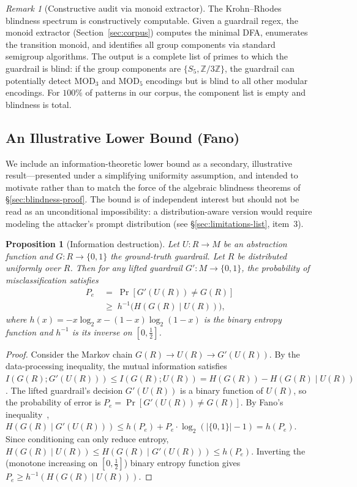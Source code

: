 \documentclass[letterpaper,twocolumn,10pt]{article}
\newtheorem{proposition}[theorem]{Proposition}
\theoremstyle{definition}
\theoremstyle{remark}
\newtheorem{remark}[theorem]{Remark}
\begin{document}
\begin{remark}[Constructive audit via monoid extractor]
The Krohn--Rhodes blindness spectrum is constructively computable.
Given a guardrail regex, the monoid extractor (Section~\ref{sec:corpus}) computes
the minimal DFA, enumerates the transition monoid, and identifies all group
components via standard semigroup algorithms.
The output is a complete list of primes to which the guardrail is blind: if the
group components are $\{S_5, \mathbb{Z}/3\mathbb{Z}\}$, the guardrail can
potentially detect $\mathrm{MOD}_3$ and $\mathrm{MOD}_5$ encodings but is blind to
all other modular encodings.
For $100\%$ of patterns in our corpus, the component list is empty and blindness
is total.
\end{remark}

\subsection{An Illustrative Lower Bound (Fano)}\label{sec:fano}

We include an information-theoretic lower bound as a secondary, illustrative
result---presented under a simplifying uniformity assumption, and intended to
motivate rather than to match the force of the algebraic blindness theorems of
\S\ref{sec:blindness-proof}.
The bound is of independent interest but should not be read as an unconditional
impossibility: a distribution-aware version would require modeling the
attacker's prompt distribution (see \S\ref{sec:limitations-list}, item~3).

\begin{proposition}[Information destruction]\label{prop:fano}
Let $U\colon R \to M$ be an abstraction function and $G\colon R \to \{0,1\}$
the ground-truth guardrail.
Let $R$ be distributed uniformly over $R$.
Then for any lifted guardrail $G'\colon M \to \{0,1\}$, the probability of
misclassification satisfies
\begin{align*}
  P_e &\;=\; \Pr[G'(U(R)) \neq G(R)] \\
      &\;\geq\; h^{-1}\!\bigl(H(G(R) \mid U(R))\bigr),
\end{align*}
where $h(x) = -x\log_2 x - (1-x)\log_2(1-x)$ is the binary entropy function and
$h^{-1}$ is its inverse on $[0, \tfrac{1}{2}]$.
\end{proposition}

\begin{proof}
Consider the Markov chain $G(R) \to U(R) \to G'(U(R))$.
By the data-processing inequality, the mutual information satisfies
$I(G(R); G'(U(R))) \leq I(G(R); U(R)) = H(G(R)) - H(G(R) \mid U(R))$.
The lifted guardrail's decision $G'(U(R))$ is a binary function of $U(R)$, so the
probability of error is $P_e = \Pr[G'(U(R)) \neq G(R)]$.
By Fano's inequality~\cite{cover2006elements},
$H(G(R) \mid G'(U(R))) \leq h(P_e) + P_e \cdot \log_2(|\{0,1\}| - 1) = h(P_e)$.
Since conditioning can only reduce entropy,
$H(G(R) \mid U(R)) \leq H(G(R) \mid G'(U(R))) \leq h(P_e)$.
Inverting the (monotone increasing on $[0, \tfrac{1}{2}]$) binary entropy function
gives $P_e \geq h^{-1}(H(G(R) \mid U(R)))$.
\end{proof}
\end{document}
